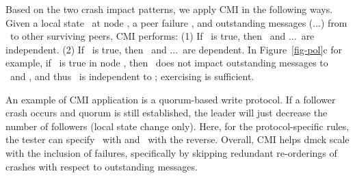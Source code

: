 Based on the two crash impact patterns, we apply CMI in the following ways.
%
Given a local state \ls\ at node \nn, a peer failure \xx, and outstanding
messages (\mone...\mn) from \nn\ to other surviving peers, CMI performs:
%
(1) If \pl\ is true, then \xx\ and \mone...\mn\ are independent.
%
(2) If \pg\ is true, then \xx\ and \mone...\mn\ are dependent.
%
In Figure~\ref{fig-pol}c for example, if \pl\ is true in node ,
then \xx\ does not impact outstanding messages to \fone\ and \ftwo,
and thus \xx\ is independent to ; exercising
 is sufficient.


An example of CMI application is a quorum-based write protocol.  If a
follower crash occurs and quorum is still established, the leader will
just decrease the number of followers (local state change only).  Here,
for the protocol-specific rules, the tester can specify \pl\ with
 \ts{>=}  and \pg\ with the reverse. 
Overall, CMI helps dmck scale with the inclusion of failures, specifically by
skipping redundant re-orderings of crashes with respect to outstanding
messages.

